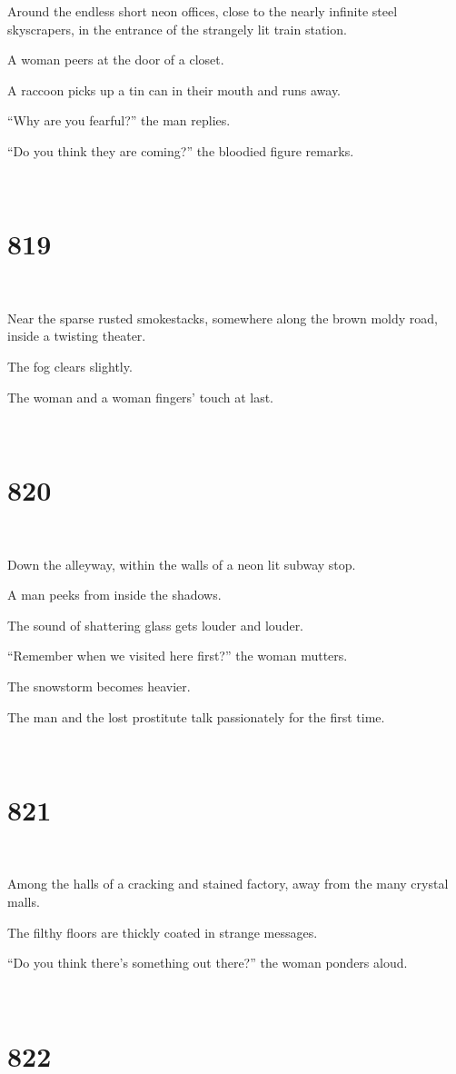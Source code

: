 \documentclass{report}
\begin{document}
Around the endless short neon offices, close to the nearly infinite steel skyscrapers, in the entrance of the strangely lit train station.

A woman peers at the door of a closet.

A raccoon picks up a tin can in their mouth and runs away.

``Why are you fearful?'' the man replies.

``Do you think they are coming?'' the bloodied figure remarks.

~
\chapter*{819}
~

Near the sparse rusted smokestacks, somewhere along the brown moldy road, inside a twisting theater.

The fog clears slightly.

The woman and a woman fingers' touch at last.

~
\chapter*{820}
~

Down the alleyway, within the walls of a neon lit subway stop.

A man peeks from inside the shadows.

The sound of shattering glass gets louder and louder.

``Remember when we visited here first?'' the woman mutters.

The snowstorm becomes heavier.

The man and the lost prostitute talk passionately for the first time.

~
\chapter*{821}
~

Among the halls of a cracking and stained factory, away from the many crystal malls.

The filthy floors are thickly coated in strange messages.

``Do you think there's something out there?'' the woman ponders aloud.

~
\chapter*{822}
~
\end{document}
